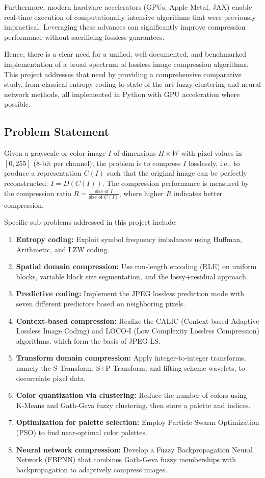 Furthermore, modern hardware accelerators (GPUs, Apple Metal, JAX) enable real-time execution of computationally intensive algorithms that were previously impractical. Leveraging these advances can significantly improve compression performance without sacrificing lossless guarantees.

Hence, there is a clear need for a unified, well-documented, and benchmarked implementation of a broad spectrum of lossless image compression algorithms. This project addresses that need by providing a comprehensive comparative study, from classical entropy coding to state-of-the-art fuzzy clustering and neural network methods, all implemented in Python with GPU acceleration where possible.

\subsection{Problem Statement}

Given a grayscale or color image \( I \) of dimensions \( H \times W \) with pixel values in \( [0, 255] \) (8‑bit per channel), the problem is to compress \( I \) losslessly, i.e., to produce a representation \( C(I) \) such that the original image can be perfectly reconstructed: \( I = D(C(I)) \). The compression performance is measured by the compression ratio \( R = \frac{\text{size of }I}{\text{size of }C(I)} \), where higher \( R \) indicates better compression.

Specific sub-problems addressed in this project include:

\begin{enumerate}
    \item \textbf{Entropy coding:} Exploit symbol frequency imbalances using Huffman, Arithmetic, and LZW coding.
    \item \textbf{Spatial domain compression:} Use run‑length encoding (RLE) on uniform blocks, variable block size segmentation, and the lossy+residual approach.
    \item \textbf{Predictive coding:} Implement the JPEG lossless prediction mode with seven different predictors based on neighboring pixels.
    \item \textbf{Context‑based compression:} Realize the CALIC (Context‑based Adaptive Lossless Image Coding) and LOCO‑I (Low Complexity Lossless Compression) algorithms, which form the basis of JPEG‑LS.
    \item \textbf{Transform domain compression:} Apply integer‑to‑integer transforms, namely the S‑Transform, S+P Transform, and lifting scheme wavelets, to decorrelate pixel data.
    \item \textbf{Color quantization via clustering:} Reduce the number of colors using K‑Means and Gath‑Geva fuzzy clustering, then store a palette and indices.
    \item \textbf{Optimization for palette selection:} Employ Particle Swarm Optimization (PSO) to find near‑optimal color palettes.
    \item \textbf{Neural network compression:} Develop a Fuzzy Backpropagation Neural Network (FBPNN) that combines Gath‑Geva fuzzy memberships with backpropagation to adaptively compress images.
\end{enumerate}

